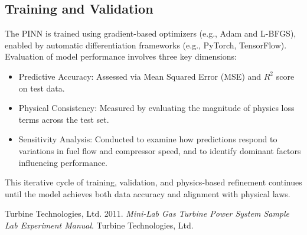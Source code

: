 \documentclass[
  12pt,
  oneside,
  a4paper,
  english,
  brazil]{abntex2}
\newlength{\cslhangindent}
\newenvironment{CSLReferences}[2] %
 {\begin{list}{}{%
  \setlength{\itemindent}{0pt}
  \setlength{\leftmargin}{0pt}
  \setlength{\parsep}{0pt}
  \ifodd #1
   \setlength{\leftmargin}{\cslhangindent}
   \setlength{\itemindent}{-1\cslhangindent}
  \fi
  \setlength{\itemsep}{#2\baselineskip}}}
 {\end{list}}
\begin{document}
\subsection{Training and Validation}\label{training-and-validation}

The PINN is trained using gradient-based optimizers (e.g., Adam and
L-BFGS), enabled by automatic differentiation frameworks (e.g., PyTorch,
TensorFlow). Evaluation of model performance involves three key
dimensions:

\begin{itemize}
    \item Predictive Accuracy: Assessed via Mean Squared Error (MSE) and $R^2$ score on test data.
    \item Physical Consistency: Measured by evaluating the magnitude of physics loss terms across the test set.
    \item Sensitivity Analysis: Conducted to examine how predictions respond to variations in fuel flow and compressor speed, and to identify dominant factors influencing performance.
\end{itemize}

This iterative cycle of training, validation, and physics-based
refinement continues until the model achieves both data accuracy and
alignment with physical laws.

\label{refs}
\begin{CSLReferences}{1}{0}
Turbine Technologies, Ltd. 2011. \emph{Mini-Lab Gas Turbine Power
System{\texttrademark} Sample Lab Experiment Manual}. Turbine
Technologies, Ltd.

\end{CSLReferences}
\end{document}
